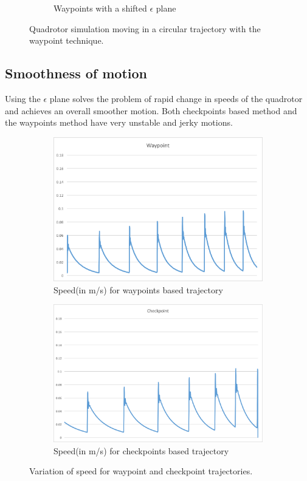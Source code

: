 \documentclass[hidelinks,BTech]{iitmdiss}
\begin{document}
\begin{figure}[H]
\begin{subfigure}[t]{0.45\textwidth}
      \caption{Waypoints with a shifted $\epsilon$ plane}
  \end{subfigure}
  \caption{Quadrotor simulation moving in a circular trajectory with the waypoint technique.}
\end{figure}

\subsection*{Smoothness of motion}
Using the $\epsilon$ plane solves the problem of rapid change in speeds of the quadrotor and achieves an overall smoother motion. Both checkpoints based method and the waypoints method have very unstable and jerky motions.
\begin{figure}[H]
  \centering
  \begin{subfigure}[t]{0.48\textwidth}
    \centering
      \includegraphics[width=\textwidth]{Waypoints_speed.png}
      \caption{Speed(in m/s) for waypoints based trajectory}
  \end{subfigure}
  \quad
  \begin{subfigure}[t]{0.48\textwidth}
    \centering
      \includegraphics[width=\textwidth]{Checkpoint_speed.png}
      \caption{Speed(in m/s) for checkpoints based trajectory}
  \end{subfigure}
  \caption{Variation of speed for waypoint and checkpoint trajectories.}
\end{figure}
\end{document}
